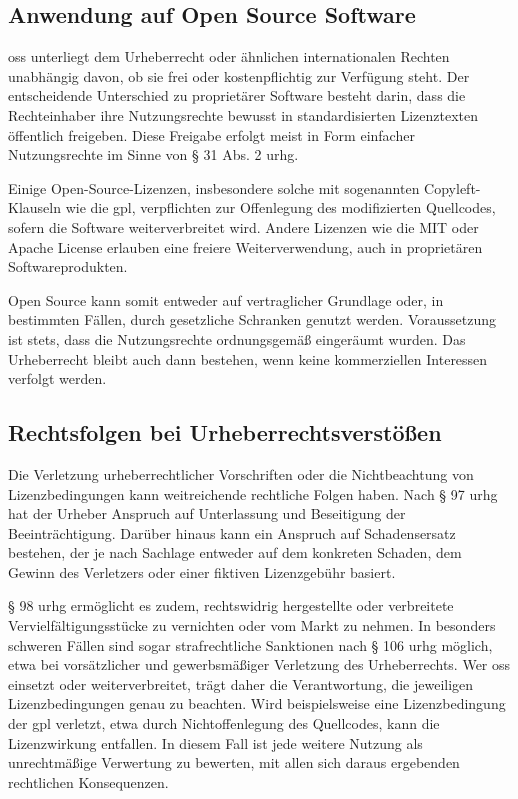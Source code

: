 \subsection{Anwendung auf Open Source Software}

\gls{oss} unterliegt dem Urheberrecht oder ähnlichen internationalen Rechten unabhängig davon, ob sie frei oder kostenpflichtig zur Verfügung steht.
Der entscheidende Unterschied zu proprietärer Software besteht darin, dass die Rechteinhaber ihre Nutzungsrechte bewusst in standardisierten Lizenztexten öffentlich freigeben.
Diese Freigabe erfolgt meist in Form einfacher Nutzungsrechte im Sinne von § 31 Abs. 2 \gls{urhg}.

Einige Open-Source-Lizenzen, insbesondere solche mit sogenannten Copyleft-Klauseln wie die \gls{gpl}, verpflichten zur Offenlegung des modifizierten Quellcodes, sofern die Software weiterverbreitet wird.
Andere Lizenzen wie die MIT oder Apache License erlauben eine freiere Weiterverwendung, auch in proprietären Softwareprodukten.

Open Source kann somit entweder auf vertraglicher Grundlage oder, in bestimmten Fällen, durch gesetzliche Schranken genutzt werden.
Voraussetzung ist stets, dass die Nutzungsrechte ordnungsgemäß eingeräumt wurden.
Das Urheberrecht bleibt auch dann bestehen, wenn keine kommerziellen Interessen verfolgt werden.


\subsection{Rechtsfolgen bei Urheberrechtsverstößen}

Die Verletzung urheberrechtlicher Vorschriften oder die Nichtbeachtung von Lizenzbedingungen kann weitreichende rechtliche Folgen haben.
Nach § 97 \gls{urhg} hat der Urheber Anspruch auf Unterlassung und Beseitigung der Beeinträchtigung.
Darüber hinaus kann ein Anspruch auf Schadensersatz bestehen, der je nach Sachlage entweder auf dem konkreten Schaden, dem Gewinn des Verletzers oder einer fiktiven Lizenzgebühr basiert.

§ 98 \gls{urhg} ermöglicht es zudem, rechtswidrig hergestellte oder verbreitete Vervielfältigungsstücke zu vernichten oder vom Markt zu nehmen.
In besonders schweren Fällen sind sogar strafrechtliche Sanktionen nach § 106 \gls{urhg} möglich, etwa bei vorsätzlicher und gewerbsmäßiger Verletzung des Urheberrechts.
Wer \gls{oss} einsetzt oder weiterverbreitet, trägt daher die Verantwortung, die jeweiligen Lizenzbedingungen genau zu beachten.
Wird beispielsweise eine Lizenzbedingung der \gls{gpl} verletzt, etwa durch Nichtoffenlegung des Quellcodes, kann die Lizenzwirkung entfallen.
In diesem Fall ist jede weitere Nutzung als unrechtmäßige Verwertung zu bewerten, mit allen sich daraus ergebenden rechtlichen Konsequenzen.

